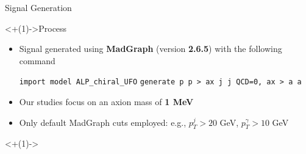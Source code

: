\documentclass[]{beamer}
\begin{document}
\begin{frame}{Signal Generation}
    \begin{center}
        \begin{block}<+(1)->{Process}
            \begin{itemize}[<+(1)->]
                \item Signal generated using \textbf{MadGraph} (version \textbf{2.6.5}) with the following command
            
                \smallskip
            
                \texttt{import model ALP\_chiral\_UFO} \newline
                \texttt{generate p p > ax j j QCD=0, ax > a a}
            
                \smallskip
            
                \item Our studies focus on an axion mass of \textbf{1 MeV}
                \item Only default MadGraph cuts employed: e.g., $p_T^j > 20$ GeV, $p_T^\gamma > 10$ GeV
            \end{itemize}
        \end{block}
        
        \bigskip
        
        \uncover<+(1)->{
            }
\end{center}
\end{frame}
\end{document}
